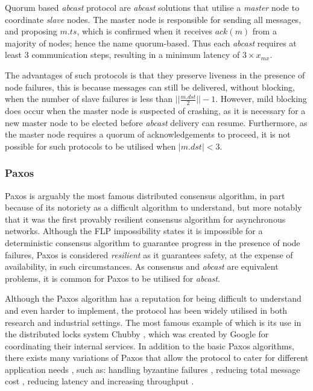 	Quorum based \emph{abcast} protocol are \emph{abcast} solutions that utilise a \emph{master} node to coordinate \emph{slave} nodes.  The master node is responsible for sending all messages, and proposing $m.ts$, which is confirmed when it receives $ack(m)$ from a majority of nodes; hence the name quorum-based.  Thus each \emph{abcast} requires at least 3 communication steps, resulting in a minimum latency of $3 \times x_{mx}$.  
	
	The advantages of such protocols is that they preserve liveness in the presence of node failures, this is because messages can still be delivered, without blocking, when the number of slave failures is less than $\vert\vert \frac{m.dst}{2} \vert\vert - 1$.  However, mild blocking does occur when the master node is suspected of crashing, as it is necessary for a new master node to be elected before \emph{abcast} delivery can resume. Furthermore, as the master node requires a quorum of acknowledgements to proceed, it is not possible for such protocols to be utilised when $\left\vert m.dst \right\vert < 3$. 
		
		\subsubsection*{Paxos}
		Paxos\citep{Lamport:1998:PP:279227.279229}\citep{Lamport:2001:PaxosMadeSimple} is arguably the most famous distributed consensus algorithm, in part because of its notoriety as a difficult algorithm to understand, but more notably that it was the first provably resilient consensus algorithm for asynchronous networks.  Although the FLP \citep{Fischer:1985:IDC:3149.214121} impossibility states it is impossible for a deterministic consensus algorithm to guarantee progress in the presence of node failures, Paxos is considered \emph{resilient} as it guarantees safety, at the expense of availability, in such circumstances.  As consensus and \emph{abcast} are equivalent problems\citep{Defago:2004:TOB:1041680.1041682}, it is common for Paxos to be utilised for \emph{abcast}.  
		
		Although the Paxos algorithm has a reputation for being difficult to understand and even harder to implement, the protocol has been widely utilised in both research and industrial settings.  The most famous example of which is its use in the distributed locks system Chubby \citep{Burrows:2006:CLS:1298455.1298487}, which was created by Google for coordinating their internal services.  In addition to the basic Paxos algorithms, there exists many variations of Paxos that allow the protocol to cater for different application needs \citep{DBLP:journals/corr/MarandiBPB14}, such as: handling byzantine failures \citep{DBLP:conf/wdag/Lamport11a}, reducing total message cost \citep{DBLP:conf/dsn/LamportM04}, reducing latency \citep{DBLP:journals/dc/Lamport06} and increasing throughput \citep{marandi2010ring, Santos:2012:TPH:2183677.2183688}.  
		
